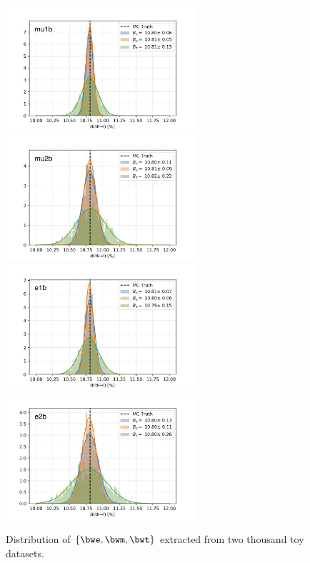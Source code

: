 \begin{figure}[ht]
    \centering
    \includegraphics[width=7cm]{chapters/Analysis/sectionStatisticalAnalysis/figures/test_mu1b.png}
    \includegraphics[width=7cm]{chapters/Analysis/sectionStatisticalAnalysis/figures/test_mu2b.png}
    \includegraphics[width=7cm]{chapters/Analysis/sectionStatisticalAnalysis/figures/test_e1b.png}
    \includegraphics[width=7cm]{chapters/Analysis/sectionStatisticalAnalysis/figures/test_e2b.png}
    
    \caption{ Distribution of $\{\bwe,\bwm,\bwt\}$ extracted from two thousand toy datasets. }
    \label{fig:analysis:method:counting:test_toy}
\end{figure}


